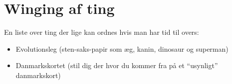 \section{Winging af ting}
En liste over ting der lige kan ordnes hvis man har tid til overs:
\begin{itemize}
\item Evolutionsleg (sten-saks-papir som æg, kanin, dinosaur og superman)
\item Danmarkskortet (stil dig der hvor du kommer fra på et ``usynligt'' danmarkskort)
\end{itemize}